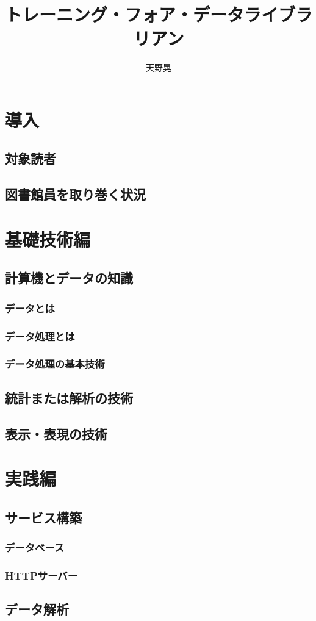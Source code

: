 \documentclass[11pt,a5paper]{book}
\title{トレーニング・フォア・データライブラリアン}
\author{天野晃}
\begin{document}
\maketitle
\tableofcontents

\part{導入}
\chapter{対象読者}


\chapter{図書館員を取り巻く状況}


\part{基礎技術編}
\chapter{計算機とデータの知識}
\section{データとは}

\section{データ処理とは}

\section{データ処理の基本技術}


\chapter{統計または解析の技術}

\chapter{表示・表現の技術}

\part{実践編}
\chapter{サービス構築}
\section{データベース}
\section{HTTPサーバー}

\chapter{データ解析}



\end{document}
